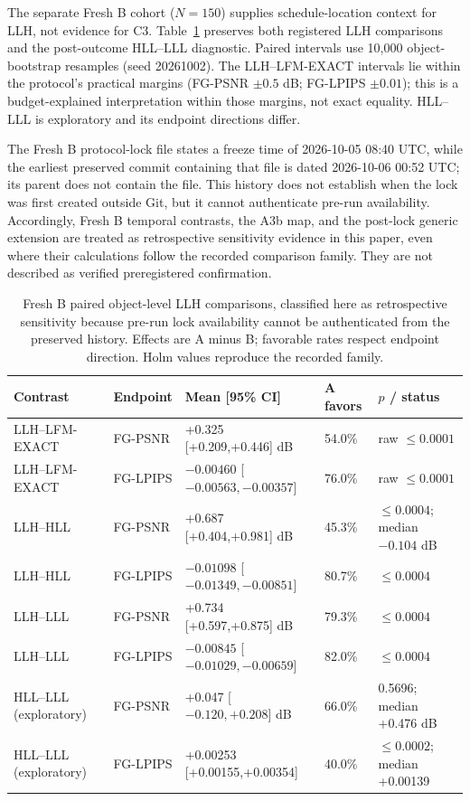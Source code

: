 \documentclass[11pt]{article}
\begin{document}
The separate Fresh B cohort ($N=150$) supplies schedule-location context for LLH, not evidence for C3. Table~\ref{tab:supp-freshb} preserves both registered LLH comparisons and the post-outcome HLL--LLL diagnostic. Paired intervals use 10,000 object-bootstrap resamples (seed 20261002). The LLH--LFM-EXACT intervals lie within the protocol's practical margins (FG-PSNR $\pm0.5$ dB; FG-LPIPS $\pm0.01$); this is a budget-explained interpretation within those margins, not exact equality. HLL--LLL is exploratory and its endpoint directions differ.

The Fresh B protocol-lock file states a freeze time of 2026-10-05 08:40 UTC, while the earliest preserved commit containing that file is dated 2026-10-06 00:52 UTC; its parent does not contain the file. This history does not establish when the lock was first created outside Git, but it cannot authenticate pre-run availability. Accordingly, Fresh B temporal contrasts, the A3b map, and the post-lock generic extension are treated as retrospective sensitivity evidence in this paper, even where their calculations follow the recorded comparison family. They are not described as verified preregistered confirmation.

\begin{table}[ht]
\centering\small
\caption{Fresh B paired object-level LLH comparisons, classified here as retrospective sensitivity because pre-run lock availability cannot be authenticated from the preserved history. Effects are A minus B; favorable rates respect endpoint direction. Holm values reproduce the recorded family.}\label{tab:supp-freshb}
\begin{tabular}{p{3.7cm}p{1.7cm}p{5.7cm}p{1.4cm}p{2.2cm}}\toprule Contrast & Endpoint & Mean [95\% CI] & A favors & $p$ / status \\\midrule
LLH--LFM-EXACT & FG-PSNR & +0.325 [+0.209,+0.446] dB & 54.0\% & raw $\leq0.0001$ \\
LLH--LFM-EXACT & FG-LPIPS & $-0.00460$ [$-0.00563,-0.00357$] & 76.0\% & raw $\leq0.0001$ \\
LLH--HLL & FG-PSNR & +0.687 [+0.404,+0.981] dB & 45.3\% & $\leq0.0004$; median $-0.104$ dB \\
LLH--HLL & FG-LPIPS & $-0.01098$ [$-0.01349,-0.00851$] & 80.7\% & $\leq0.0004$ \\
LLH--LLL & FG-PSNR & +0.734 [+0.597,+0.875] dB & 79.3\% & $\leq0.0004$ \\
LLH--LLL & FG-LPIPS & $-0.00845$ [$-0.01029,-0.00659$] & 82.0\% & $\leq0.0004$ \\
HLL--LLL (exploratory) & FG-PSNR & +0.047 [$-0.120,+0.208$] dB & 66.0\% & 0.5696; median +0.476 dB \\
HLL--LLL (exploratory) & FG-LPIPS & +0.00253 [+0.00155,+0.00354] & 40.0\% & $\leq0.0002$; median +0.00139 \\
\bottomrule\end{tabular}
\end{table}
\end{document}
